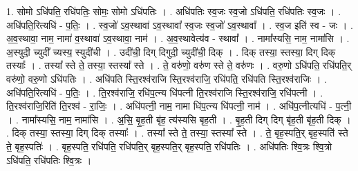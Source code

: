 \documentclass[17pt]{extarticle}
\begin{document}
1. सोमो ऽधि॑पति॒ रधि॑पतिः॒ सोमः॒ सोमो ऽधि॑पतिः । . अधि॑पतिः स्व॒जः स्व॒जो ऽधि॑पति॒ रधि॑पतिः स्व॒जः । . अधि॑पति॒रित्यधि॑ - प॒तिः॒ । . स्व॒जो॑ ऽव॒स्थावा॑ ऽव॒स्थावा᳚ स्व॒जः स्व॒जो॑ ऽव॒स्थावा᳚ । . स्व॒ज इति॑ स्व - जः । . अ॒व॒स्थावा॒ नाम॒ नामा॑ व॒स्थावा॑ ऽव॒स्थावा॒ नाम॑ । . अ॒व॒स्थावेत्य॑व - स्थावा᳚ । . नामा᳚स्यसि॒ नाम॒ नामा॑सि । . अ॒स्युदी॒ च्युदी᳚ च्यस्य॒ स्युदी॑ची । . उदी॑ची॒ दिग् दिगुदी॒ च्युदी॑ची॒ दिक् । . दिक् तस्या॒ स्तस्या॒ दिग् दिक् तस्याः᳚ । . तस्या᳚ स्ते ते॒ तस्या॒ स्तस्या᳚ स्ते । . ते॒ वरु॑णो॒ वरु॑ण स्ते ते॒ वरु॑णः । . वरु॒णो ऽधि॑पति॒ रधि॑पति॒र् वरु॑णो॒ वरु॒णो ऽधि॑पतिः । . अधि॑पति स्ति॒रश्व॑राजि स्ति॒रश्व॑राजि॒ रधि॑पति॒ रधि॑पति स्ति॒रश्व॑राजिः । . अधि॑पति॒रित्यधि॑ - प॒तिः॒ । . ति॒रश्व॑राजि॒ रधि॑प॒त्न्य धि॑पत्नी ति॒रश्व॑राजि स्ति॒रश्व॑राजि॒ रधि॑पत्नी । . ति॒रश्व॑राजि॒रिति॑ ति॒रश्व॑ - रा॒जिः॒ । . अधि॑पत्नी॒ नाम॒ नामा धि॑प॒त्न्य धि॑पत्नी॒ नाम॑ । . अधि॑प॒त्नीत्यधि॑ - प॒त्नी॒ । . नामा᳚स्यसि॒ नाम॒ नामा॑सि । . अ॒सि॒ बृ॒ह॒ती बृ॑ह॒ त्य॑स्यसि बृह॒ती । . बृ॒ह॒ती दिग् दिग् बृ॑ह॒ती बृ॑ह॒ती दिक् । . दिक् तस्या॒ स्तस्या॒ दिग् दिक् तस्याः᳚ । . तस्या᳚ स्ते ते॒ तस्या॒ स्तस्या᳚ स्ते । . ते॒ बृह॒स्पति॒र् बृह॒स्पति॑ स्ते ते॒ बृह॒स्पतिः॑ । . बृह॒स्पति॒ रधि॑पति॒ रधि॑पति॒र् बृह॒स्पति॒र् बृह॒स्पति॒ रधि॑पतिः । . अधि॑पतिः श्वि॒त्रः श्वि॒त्रो ऽधि॑पति॒ रधि॑पतिः श्वि॒त्रः । \newline
\end{document}
